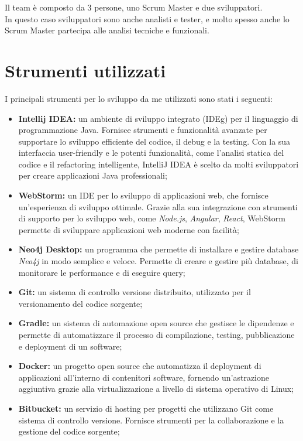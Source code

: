 \noindent Il team è composto da 3 persone, uno \gls{Scrum Master} e due sviluppatori. \\
In questo caso sviluppatori sono anche analisti e tester, e molto spesso anche lo \gls{Scrum Master} 
partecipa alle analisi tecniche e funzionali. \\


\section{Strumenti utilizzati}
I principali strumenti per lo sviluppo da me utilizzati sono stati i seguenti:\\
\begin{itemize}
  \item \textbf{Intellij IDEA:} un ambiente di sviluppo integrato (\gls{IDEg}) per il linguaggio di programmazione Java. Fornisce strumenti e funzionalità avanzate per supportare lo sviluppo efficiente del codice, il debug e la testing. Con la sua interfaccia user-friendly e le potenti funzionalità, come l'analisi statica del codice e il refactoring intelligente, IntelliJ IDEA è scelto da molti sviluppatori per creare applicazioni Java professionali;
  \item \textbf{WebStorm:} un IDE per lo sviluppo di applicazioni web, che fornisce un'esperienza di sviluppo ottimale. Grazie alla sua integrazione con strumenti di supporto per lo sviluppo web, come \textit{Node.js}, \textit{Angular}, \textit{React}, WebStorm permette di sviluppare applicazioni web moderne con facilità;
  \item \textbf{Neo4j Desktop:} un programma che permette di installare e gestire database \textit{Neo4j} in modo semplice e veloce. Permette di creare e gestire più database, di monitorare le performance e di eseguire query;
  \item \textbf{Git:} un sistema di controllo versione distribuito, utilizzato per il versionamento del codice sorgente; 
  \item \textbf{Gradle:} un sistema di automazione open source che gestisce le dipendenze e permette di automatizzare il processo di compilazione, testing, pubblicazione e deployment di un software;
  \item \textbf{Docker:} un progetto open source che automatizza il deployment di applicazioni all'interno di contenitori software, fornendo un'astrazione aggiuntiva grazie alla virtualizzazione a livello di sistema operativo di Linux;
  \item \textbf{Bitbucket:} un servizio di hosting per progetti che utilizzano Git come sistema di controllo versione. Fornisce strumenti per la collaborazione e la gestione del codice sorgente;

\end{itemize}
